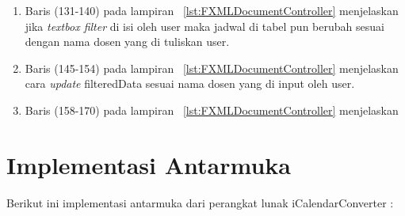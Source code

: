 \begin{enumerate}
\begin{enumerate}
	\item Baris (131-140) pada lampiran ~\ref{lst:FXMLDocumentController} menjelaskan jika \textit{textbox filter} di isi oleh user maka jadwal di tabel pun berubah sesuai dengan nama dosen yang di tuliskan user.
	\item Baris (145-154) pada lampiran ~\ref{lst:FXMLDocumentController} menjelaskan cara \textit{update} filteredData sesuai nama dosen yang di input oleh user.
	\item Baris (158-170) pada lampiran ~\ref{lst:FXMLDocumentController} menjelaskan
\end{enumerate}
	
\end{enumerate}

\section{Implementasi Antarmuka}
Berikut ini implementasi antarmuka dari perangkat lunak iCalendarConverter :
